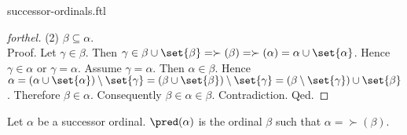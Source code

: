 \documentclass{naproche-library}
\begin{document}
\begin{smodule}{successor-ordinals.ftl}
\begin{proof}[forthel]
    (2) $\beta \subseteq \alpha$. \\
    Proof.
      Let $\gamma \in \beta$.
      Then $\gamma \in \beta \cup \set{\beta}
        = \succ(\beta)
        = \succ(\alpha)
        = \alpha \cup \set{\alpha}$.
      Hence $\gamma \in \alpha$ or $\gamma = \alpha$.
      Assume $\gamma = \alpha$.
      Then $\alpha \in \beta$.
      Hence $\alpha
        = (\alpha \cup \set{\alpha}) \setminus \set{\gamma}
        = (\beta \cup \set{\beta}) \setminus \set{\gamma}
        = (\beta \setminus \set{\gamma}) \cup \set{\beta}$.
      Therefore $\beta \in \alpha$.
      Consequently $\beta \in \alpha \in \beta$.
      Contradiction.
    Qed.
  \end{proof}

  \begin{definition}[forthel,id=SET_THEORY_02_735071524880384,printid]
    Let $\alpha$ be a successor ordinal.
    $\pred(\alpha)$ is the ordinal $\beta$ such that $\alpha = \succ(\beta)$.
  \end{definition}
\end{smodule}
\end{document}
